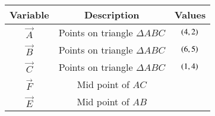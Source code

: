 \begin{tabular}[12pt]{ |c| c| c|}
    \hline
    \textbf{Variable} & \textbf{Description} & \textbf{Values} \\ 
    \hline
    $\vec{A}$ & Points on triangle $\Delta{ABC}$ & $\left(4,2\right)$ \\
    \hline
    $\vec{B}$ & Points on triangle $\Delta{ABC}$ & $\left(6,5\right)$ \\
    \hline
    $\vec{C}$ & Points on triangle $\Delta{ABC}$ & $\left(1,4\right)$ \\
    \hline
    $\vec{F}$ &  Mid point of $AC$ & \\
    \hline 
    $\vec{E}$ &  Mid point of $AB$ & \\
    \hline   
    \end{tabular}
